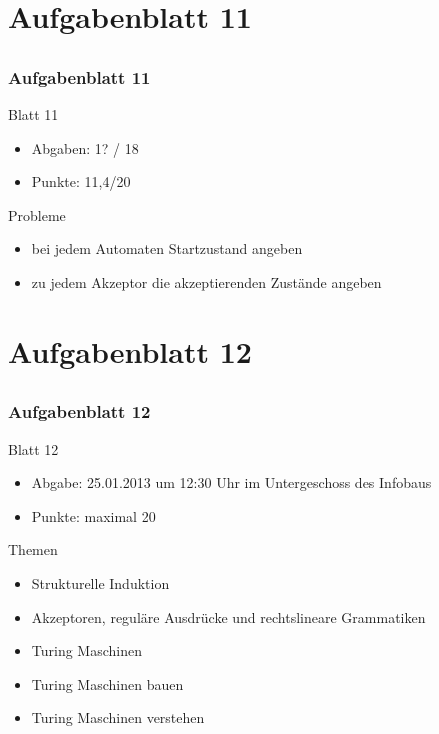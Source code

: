 

\section[Blatt 11]{Aufgabenblatt 11}
\subsection*{}
\begin{frame}
	\frametitle{Aufgabenblatt 11}
	\begin{block}{Blatt 11}
		\begin{itemize}
			\item Abgaben: 1? / 18
			\item Punkte: 11,4/20
		\end{itemize}
   \end{block}
	\begin{block}{Probleme}
 		\begin{itemize}
		   \item bei jedem Automaten Startzustand angeben \pause
		   \item zu jedem Akzeptor die akzeptierenden Zustände angeben
 	  \end{itemize}
	\end{block}
\end{frame}

\section[Blatt 12]{Aufgabenblatt 12}
\subsection*{}
\begin{frame}
	\frametitle{Aufgabenblatt 12}
	\begin{block}{Blatt 12}
		\begin{itemize}
			\item Abgabe: 25.01.2013 um 12:30 Uhr im Untergeschoss des Infobaus
			\item Punkte: maximal 20
		\end{itemize}
  	\end{block}
	\begin{block}{Themen}
		\begin{itemize}
	  		\item Strukturelle Induktion \pause
	  		\item Akzeptoren, reguläre Ausdrücke und rechtslineare Grammatiken \pause
	  		\item Turing Maschinen \pause
	  		\item Turing Maschinen bauen\pause 
	  		\item Turing Maschinen verstehen 
	 	\end{itemize}
	\end{block}
\end{frame}
